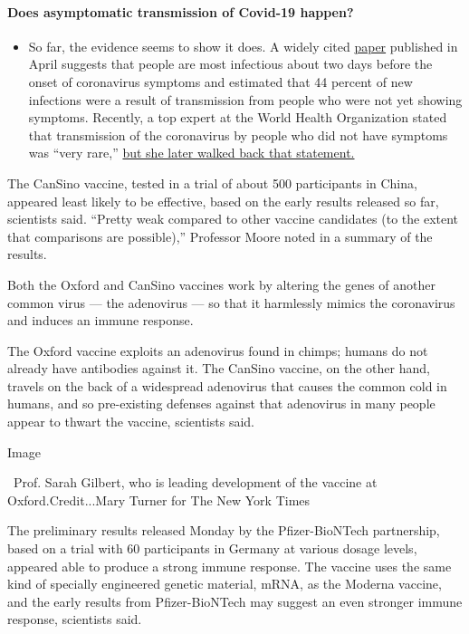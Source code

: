 \begin{itemize}
{  \paragraph{Does asymptomatic transmission of Covid-19
  happen?}\label{does-asymptomatic-transmission-of-covid-19-happen}}

  \begin{itemize}
  \tightlist
  \item
    So far, the evidence seems to show it does. A widely cited
    \href{https://www.nature.com/articles/s41591-020-0869-5}{paper}
    published in April suggests that people are most infectious about
    two days before the onset of coronavirus symptoms and estimated that
    44 percent of new infections were a result of transmission from
    people who were not yet showing symptoms. Recently, a top expert at
    the World Health Organization stated that transmission of the
    coronavirus by people who did not have symptoms was ``very rare,''
    \href{https://www.nytimes.com/2020/06/09/world/coronavirus-updates.html?action=click\&pgtype=Article\&state=default\&region=MAIN_CONTENT_3\&context=storylines_faq\#link-1f302e21}{but
    she later walked back that statement.}
  \end{itemize}
\end{itemize}

The CanSino vaccine, tested in a trial of about 500 participants in
China, appeared least likely to be effective, based on the early results
released so far, scientists said. ``Pretty weak compared to other
vaccine candidates (to the extent that comparisons are possible),''
Professor Moore noted in a summary of the results.

Both the Oxford and CanSino vaccines work by altering the genes of
another common virus --- the adenovirus --- so that it harmlessly mimics
the coronavirus and induces an immune response.

The Oxford vaccine exploits an adenovirus found in chimps; humans do not
already have antibodies against it. The CanSino vaccine, on the other
hand, travels on the back of a widespread adenovirus that causes the
common cold in humans, and so pre-existing defenses against that
adenovirus in many people appear to thwart the vaccine, scientists said.

Image

~Prof. Sarah Gilbert, who is leading development of the vaccine at
Oxford.Credit...Mary Turner for The New York Times

The preliminary results released Monday by the Pfizer-BioNTech
partnership, based on a trial with 60 participants in Germany at various
dosage levels, appeared able to produce a strong immune response. The
vaccine uses the same kind of specially engineered genetic material,
mRNA, as the Moderna vaccine, and the early results from Pfizer-BioNTech
may suggest an even stronger immune response, scientists said.

